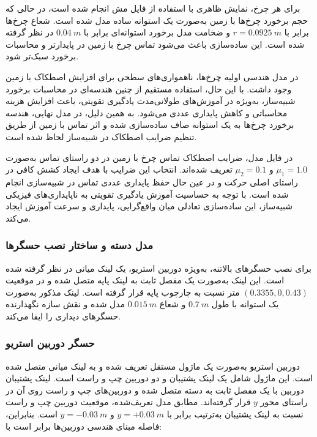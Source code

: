 برای هر چرخ، نمایش ظاهری با استفاده از فایل مش انجام شده است، در حالی که حجم برخورد چرخ‌ها با زمین به‌صورت یک استوانه ساده مدل شده است. شعاع چرخ‌ها برابر با \(r=0.0925~m\) و ضخامت مدل برخورد استوانه‌ای برابر با \(0.04~m\) در نظر گرفته شده است. این ساده‌سازی باعث می‌شود تماس چرخ با زمین در  پایدارتر و محاسبات برخورد سبک‌تر شود.

در مدل هندسی اولیه چرخ‌ها، ناهمواری‌های سطحی برای افزایش اصطکاک با زمین وجود داشت. با این حال، استفاده مستقیم از چنین هندسه‌ای در محاسبات برخورد شبیه‌ساز، به‌ویژه در آموزش‌های طولانی‌مدت یادگیری تقویتی، باعث افزایش هزینه محاسباتی و کاهش پایداری عددی می‌شود. به همین دلیل، در مدل نهایی، هندسه برخورد چرخ‌ها به یک استوانه صاف ساده‌سازی شده و اثر تماس با زمین از طریق تنظیم ضرایب اصطکاک در شبیه‌ساز لحاظ شده است.

در فایل مدل، ضرایب اصطکاک تماس چرخ با زمین در دو راستای تماس به‌صورت \(\mu_1=1.0\) و \(\mu_2=0.1\) تعریف شده‌اند. انتخاب این ضرایب با هدف ایجاد کشش کافی در راستای اصلی حرکت و در عین حال حفظ پایداری عددی تماس در شبیه‌سازی انجام شده است. با توجه به حساسیت آموزش یادگیری تقویتی به ناپایداری‌های فیزیکی شبیه‌ساز، این ساده‌سازی تعادلی میان واقع‌گرایی، پایداری و سرعت آموزش ایجاد می‌کند.

\subsubsection{مدل دسته و ساختار نصب حسگرها}
\label{subsubsec:handle_sensor_mount}

برای نصب حسگرهای بالاتنه، به‌ویژه دوربین استریو، یک لینک میانی در نظر گرفته شده است. این لینک به‌صورت یک مفصل ثابت به لینک پایه متصل شده و در موقعیت \((0.3355,0,0.43)\) متر نسبت به چارچوب پایه قرار گرفته است. لینک مذکور به‌صورت یک استوانه با طول \(0.7~m\) و شعاع \(0.015~m\) مدل شده و نقش سازه نگهدارنده حسگرهای دیداری را ایفا می‌کند.

\subsubsection{حسگر دوربین استریو}
\label{subsubsec:stereo_camera_model}

دوربین استریو به‌صورت یک ماژول مستقل تعریف شده و به لینک میانی متصل شده است. این ماژول شامل یک لینک پشتیبان و دو دوربین چپ و راست است. لینک پشتیبان دوربین با یک مفصل ثابت به دسته متصل شده و دوربین‌های چپ و راست روی آن در راستای محور \(y\) قرار گرفته‌اند. مطابق مدل تعریف‌شده، موقعیت دوربین چپ و راست نسبت به لینک پشتیبان به‌ترتیب برابر با \(y=+0.03~m\) و \(y=-0.03~m\) است. بنابراین، فاصله مبنای هندسی دوربین‌ها برابر است با:

